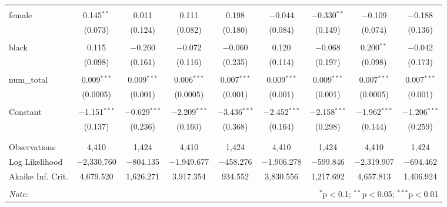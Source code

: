 \begin{table}[!htbp]
\begin{tabular}{@{\extracolsep{5pt}}lcccccccc}
  & & & & & & & & \\ 
 female & 0.145$^{**}$ & 0.011 & 0.111 & 0.198 & $-$0.044 & $-$0.330$^{**}$ & $-$0.109 & $-$0.188 \\ 
  & (0.073) & (0.124) & (0.082) & (0.180) & (0.084) & (0.149) & (0.074) & (0.136) \\ 
  & & & & & & & & \\ 
 black & 0.115 & $-$0.260 & $-$0.072 & $-$0.060 & 0.120 & $-$0.068 & 0.200$^{**}$ & $-$0.042 \\ 
  & (0.098) & (0.161) & (0.116) & (0.235) & (0.114) & (0.197) & (0.098) & (0.173) \\ 
  & & & & & & & & \\ 
 num\_total & 0.009$^{***}$ & 0.009$^{***}$ & 0.006$^{***}$ & 0.007$^{***}$ & 0.009$^{***}$ & 0.009$^{***}$ & 0.007$^{***}$ & 0.007$^{***}$ \\ 
  & (0.0005) & (0.001) & (0.0005) & (0.001) & (0.001) & (0.001) & (0.0005) & (0.001) \\ 
  & & & & & & & & \\ 
 Constant & $-$1.151$^{***}$ & $-$0.629$^{***}$ & $-$2.209$^{***}$ & $-$3.436$^{***}$ & $-$2.452$^{***}$ & $-$2.158$^{***}$ & $-$1.962$^{***}$ & $-$1.206$^{***}$ \\ 
  & (0.137) & (0.236) & (0.160) & (0.368) & (0.164) & (0.298) & (0.144) & (0.259) \\ 
  & & & & & & & & \\ 
\hline \\[-1.8ex] 
Observations & 4,410 & 1,424 & 4,410 & 1,424 & 4,410 & 1,424 & 4,410 & 1,424 \\ 
Log Likelihood & $-$2,330.760 & $-$804.135 & $-$1,949.677 & $-$458.276 & $-$1,906.278 & $-$599.846 & $-$2,319.907 & $-$694.462 \\ 
Akaike Inf. Crit. & 4,679.520 & 1,626.271 & 3,917.354 & 934.552 & 3,830.556 & 1,217.692 & 4,657.813 & 1,406.924 \\ 
\hline 
\hline \\[-1.8ex] 
\textit{Note:}  & \multicolumn{8}{r}{$^{*}$p$<$0.1; $^{**}$p$<$0.05; $^{***}$p$<$0.01} \\ 
\end{tabular} 
\end{table} 
